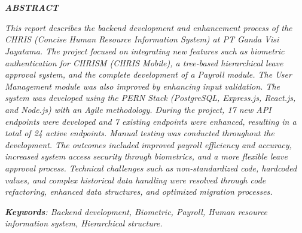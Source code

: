 \chapter*{\MakeUppercase{\textit{\judulInggris}}}
\singlespacing
\begin{center}
    
    \vspace{-4em}
    
    \penulis
    
	\bigskip
    
    \textit{\textbf{ABSTRACT}}
    
\end{center}


\vspace*{0.2cm}
{
	\setlength{\parindent}{0pt}

	\bigskip
	\bigskip


	
	\textit{This report describes the backend development and enhancement process of the CHRIS (Concise Human Resource Information System) at PT Ganda Visi Jayatama. The project focused on integrating new features such as biometric authentication for CHRISM (CHRIS Mobile), a tree-based hierarchical leave approval system, and the complete development of a Payroll module. The User Management module was also improved by enhancing input validation. The system was developed using the PERN Stack (PostgreSQL, Express.js, React.js, and Node.js) with an Agile methodology. During the project, 17 new API endpoints were developed and 7 existing endpoints were enhanced, resulting in a total of 24 active endpoints. Manual testing was conducted throughout the development. The outcomes included improved payroll efficiency and accuracy, increased system access security through biometrics, and a more flexible leave approval process. Technical challenges such as non-standardized code, hardcoded values, and complex historical data handling were resolved through code refactoring, enhanced data structures, and optimized migration processes.}
	\bigskip
 
	\textit{\textbf{Keywords}: Backend development, Biometric, Payroll, Human resource information system, Hierarchical structure.}	
}

\onehalfspacing